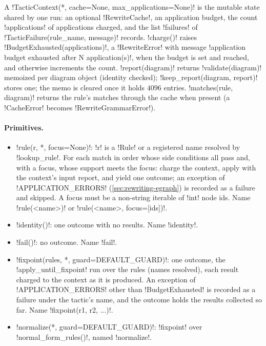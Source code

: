 \begin{definition}\label{def:rewriting-tcontext}
A \py!TacticContext(*, cache=None, max_applications=None)! is the mutable state shared by one run:
an optional \py!RewriteCache!, an application budget, the count \py!applications! of applications
charged, and the list \py!failures! of \py!TacticFailure(rule_name, message)! records.
\py!charge()! raises \py!BudgetExhausted(applications)!, a \py!RewriteError! with message
\code!application budget exhausted after N application(s)!, when the budget is set and reached, and
otherwise increments the count. \py!report(diagram)! returns \py!validate(diagram)! memoized per
diagram object (identity checked); \py!keep_report(diagram, report)! stores one; the memo is cleared
once it holds $4096$ entries. \py!matches(rule, diagram)! returns the rule's matches through the
cache when present (a \py!CacheError! becomes \py!RewriteGrammarError!).
\end{definition}

\paragraph{Primitives.}
\begin{itemize}
\item \py!rule(r, *, focus=None)!: \py!r! is a \py!Rule! or a registered name resolved by
  \py!lookup_rule!. For each match in order whose side conditions all pass and, with a focus, whose
  support meets the focus: charge the context, apply with the context's input report, and yield one
  outcome; an exception of \py!APPLICATION_ERRORS! (\cref{sec:rewriting-egraph}) is recorded as a
  failure and skipped. A focus must be a non-string iterable of \py!int! node ids. Name
  \code!rule(<name>)! or \code!rule(<name>, focus=[ids])!.
\item \py!identity()!: one outcome with no results. Name \code!identity!.
\item \py!fail()!: no outcome. Name \code!fail!.
\item \py!fixpoint(rules, *, guard=DEFAULT_GUARD)!: one outcome, the \py!apply_until_fixpoint! run
  over the rules (names resolved), each result charged to the context as it is produced. An
  exception of \py!APPLICATION_ERRORS! other than \py!BudgetExhausted! is recorded as a failure
  under the tactic's name, and the outcome holds the results collected so far. Name
  \code!fixpoint(r1, r2, ...)!.
\item \py!normalize(*, guard=DEFAULT_GUARD)!: \py!fixpoint! over \py!normal_form_rules()!, named
  \code!normalize!.
\end{itemize}

